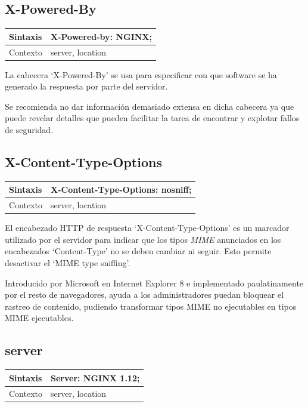 \subsection{X-Powered-By}

\begin{table}[H]
\begin{tabular}{|l|l|}
\hline
Sintaxis      & X-Powered-by: NGINX; \\ \hline
Contexto      & server, location     \\ \hline
\end{tabular}
\end{table}

La cabecera `X-Powered-By' se usa para especificar con que software se ha generado la respuesta por parte del servidor.

\bigskip
Se recomienda no dar información demasiado extensa en dicha cabecera ya que puede revelar detalles que pueden facilitar la tarea de encontrar y explotar fallos de seguridad.


\subsection{X-Content-Type-Options}

\begin{table}[H]
\begin{tabular}{|l|l|}
\hline
Sintaxis      & X-Content-Type-Options: nosniff; \\ \hline
Contexto      & server, location     \\ \hline
\end{tabular}
\end{table}

El encabezado HTTP de respuesta `X-Content-Type-Options' es un marcador utilizado por el servidor para indicar que los tipos \textit{MIME} anunciados en los encabezados `Content-Type' no se deben cambiar ni seguir. Esto permite desactivar el `MIME type sniffing'.

\bigskip
Introducido por Microsoft en Internet Explorer 8 e implementado paulatinamente por el resto de navegadores, ayuda a los administradores puedan bloquear el rastreo de contenido, pudiendo transformar tipos MIME no ejecutables en tipos MIME ejecutables.

\subsection{server}

\begin{table}[H]
\begin{tabular}{|l|l|}
\hline
Sintaxis      & Server: NGINX 1.12; \\ \hline
Contexto      & server, location     \\ \hline
\end{tabular}
\end{table}

